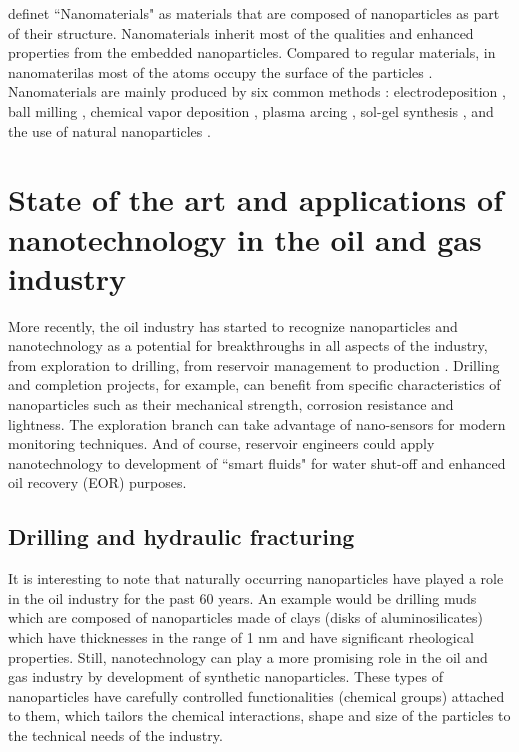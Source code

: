 \citet{Fakoya2017} definet ``Nanomaterials" as materials that are composed of nanoparticles as part of their structure. Nanomaterials inherit most of the qualities and enhanced properties from the embedded nanoparticles. Compared to regular materials, in nanomaterilas most of the atoms occupy the surface of the particles \citep{Wilson2002}. Nanomaterials are mainly produced by six common methods \citep{Hussainova2010}: electrodeposition \citep{Bera2004}, ball milling \citep{Cao2007}, chemical vapor deposition \citep{AZO2013}, plasma arcing \citep{Shashurin2015}, sol-gel synthesis \citep{Ficai2017}, and the use of natural nanoparticles \citep{Wilson2002}. 

\section{State of the art and applications of nanotechnology in the oil and gas industry}
More recently, the oil industry has started to recognize nanoparticles and nanotechnology as a potential for breakthroughs in all aspects of the industry, from exploration to drilling, from reservoir management to production \citep{Cocuzza2011}. Drilling and completion projects, for example, can benefit from specific characteristics of nanoparticles such as their mechanical strength, corrosion resistance and lightness. The exploration branch can take advantage of nano-sensors for modern monitoring techniques. And of course, reservoir engineers could apply nanotechnology to development of ``smart fluids" for water shut-off and enhanced oil recovery (EOR) purposes. 

\subsection{Drilling and hydraulic fracturing}
It is interesting to note that naturally occurring nanoparticles have played a role in the oil industry for the past 60 years. An example would be drilling muds which are composed of nanoparticles made of clays (disks of aluminosilicates) which have thicknesses in the range of 1 nm \citep{Krishnamoorti2015} and have significant rheological properties. Still, nanotechnology can play a more promising role in the oil and gas industry by development of synthetic nanoparticles. These types of nanoparticles have carefully controlled functionalities (chemical groups) attached to them, which tailors the chemical interactions, shape and size of the particles to the technical needs of the industry.

